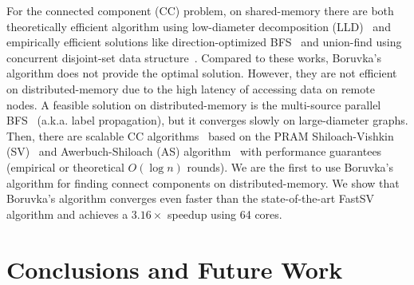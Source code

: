 \documentclass{sokendai_thesis} %
\newcommand{\boruvka}[0]{Boruvka}
\begin{document}


For the connected component (CC) problem, on shared-memory there are both theoretically efficient algorithm using low-diameter decomposition (LLD)~\cite{shun2014simple} and empirically efficient solutions like direction-optimized BFS~\cite{beamer2013direction,shun2013ligra} and union-find using concurrent disjoint-set data structure~\cite{patwary2012multi}.
Compared to these works, \boruvka{}'s algorithm does not provide the optimal solution.
However, they are not efficient on distributed-memory due to the high latency of accessing data on remote nodes.
A feasible solution on distributed-memory is the multi-source parallel BFS~\cite{bulucc2011parallel} (a.k.a. label propagation), but it converges slowly on large-diameter graphs.
Then, there are scalable CC algorithms~\cite{yan2014pregel,hashmin,lacc,fastsv} based on the PRAM Shiloach-Vishkin (SV)~\cite{ShVi82} and Awerbuch-Shiloach (AS) algorithm~\cite{AwSh87} with performance guarantees (empirical or theoretical $O(\log n)$ rounds).
We are the first to use \boruvka{}'s algorithm for finding connect components on distributed-memory.
We show that \boruvka{}'s algorithm converges even faster than the state-of-the-art FastSV~\cite{fastsv} algorithm and achieves a $3.16\times$ speedup using 64 cores.


\chapter{Conclusions and Future Work}
\label{chap:conclusion}
\end{document}
